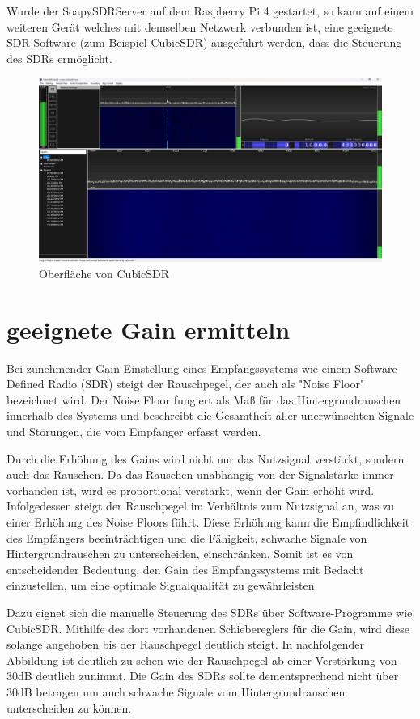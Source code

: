 Wurde der SoapySDRServer auf dem Raspberry Pi 4 gestartet, so kann auf einem weiteren Gerät welches mit demselben Netzwerk verbunden ist, eine geeignete SDR-Software (zum Beispiel CubicSDR) ausgeführt werden, dass die Steuerung des SDRs ermöglicht.

\begin{figure} [H]
	\centering
	\includegraphics[width=\linewidth]{../ref/OberflaecheCubicSDR.png}
	\caption{Oberfläche von CubicSDR}
	\label{fig:cubicsdr}
\end{figure}


\section{geeignete Gain ermitteln}
Bei zunehmender Gain-Einstellung eines Empfangssystems wie einem Software Defined Radio (SDR) steigt der Rauschpegel, der auch als "Noise Floor" bezeichnet wird. Der Noise Floor fungiert als Maß für das Hintergrundrauschen innerhalb des Systems und beschreibt die Gesamtheit aller unerwünschten Signale und Störungen, die vom Empfänger erfasst werden.

Durch die Erhöhung des Gains wird nicht nur das Nutzsignal verstärkt, sondern auch das Rauschen. Da das Rauschen unabhängig von der Signalstärke immer vorhanden ist, wird es proportional verstärkt, wenn der Gain erhöht wird. Infolgedessen steigt der Rauschpegel im Verhältnis zum Nutzsignal an, was zu einer Erhöhung des Noise Floors führt. Diese Erhöhung kann die Empfindlichkeit des Empfängers beeinträchtigen und die Fähigkeit, schwache Signale von Hintergrundrauschen zu unterscheiden, einschränken. Somit ist es von entscheidender Bedeutung, den Gain des Empfangssystems mit Bedacht einzustellen, um eine optimale Signalqualität zu gewährleisten.

Dazu eignet sich die manuelle Steuerung des SDRs über Software-Programme wie CubicSDR. Mithilfe des dort vorhandenen Schiebereglers für die Gain, wird diese solange angehoben bis der Rauschpegel deutlich steigt. In nachfolgender Abbildung ist deutlich zu sehen wie der Rauschpegel ab einer Verstärkung von 30dB deutlich zunimmt. Die Gain des SDRs sollte dementsprechend nicht über 30dB betragen um auch schwache Signale vom Hintergrundrauschen unterscheiden zu können. 

